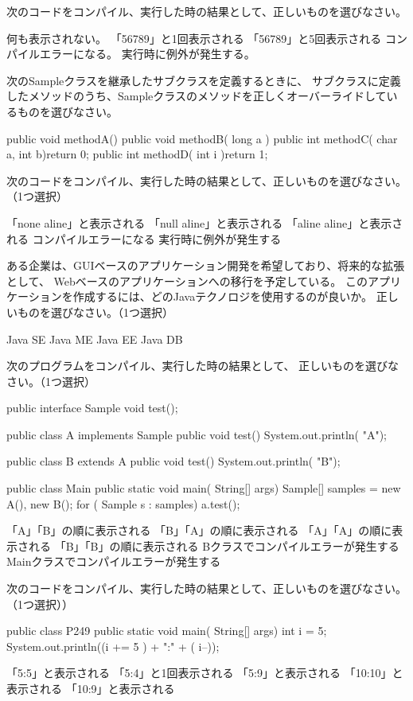 \documentclass[12pt]{jarticle}
\begin{document}
次のコードをコンパイル、実行した時の結果として、正しいものを選びなさい。


何も表示されない。
「56789」と1回表示される
「56789」と5回表示される
コンパイルエラーになる。
実行時に例外が発生する。

次のSampleクラスを継承したサブクラスを定義するときに、
サブクラスに定義したメソッドのうち、Sampleクラスのメソッドを正しくオーバーライドしているものを選びなさい。


public void  methodA(){}
public  void methodB( long a ){}
public int methodC( char a, int b){return 0;}
public int methodD( int i ){return 1;}

次のコードをコンパイル、実行した時の結果として、正しいものを選びなさい。（1つ選択）

「none aline」と表示される
「null aline」と表示される
「aline aline」と表示される
コンパイルエラーになる
実行時に例外が発生する

ある企業は、GUIベースのアプリケーション開発を希望しており、将来的な拡張として、
Webベースのアプリケーションへの移行を予定している。
このアプリケーションを作成するには、どのJavaテクノロジを使用するのが良いか。
正しいものを選びなさい。（1つ選択）

Java SE
Java ME
Java EE
Java DB

次のプログラムをコンパイル、実行した時の結果として、
正しいものを選びなさい。（1つ選択）

public interface Sample {
    void test();
}

public class A implements Sample{
    public void test(){
        System.out.println( "A");
    }
}

public class B extends A {
    public void test(){
        System.out.println( "B");
    }
}

public class Main{
    public  static void main( String[] args){
        Sample[] samples = { new A(), new B()};
        for ( Sample s : samples){
            a.test();
        }
    }
}


「A」「B」の順に表示される
「B」「A」の順に表示される
「A」「A」の順に表示される
「B」「B」の順に表示される
Bクラスでコンパイルエラーが発生する
Mainクラスでコンパイルエラーが発生する

次のコードをコンパイル、実行した時の結果として、正しいものを選びなさい。（1つ選択））

public  class P249 {
    public  static void main( String[] args){
        int i = 5;
        System.out.println((i += 5 ) + ":" + ( i--));
    }
}

「5:5」と表示される
「5:4」と1回表示される
「5:9」と表示される
「10:10」と表示される
「10:9」と表示される
\end{document}
